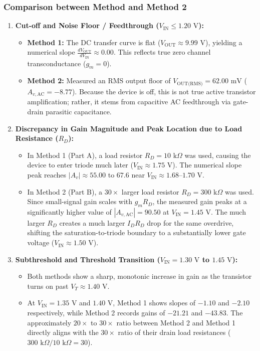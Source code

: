 \documentclass[11pt,a4paper]{article}
\begin{document}
\subsubsection*{Comparison between Method and Method 2}
\begin{enumerate}
    \item \textbf{Cut-off and Noise Floor / Feedthrough ($V_{\text{IN}} \le 1.20\text{ V}$):}
    \begin{itemize}
        \item \textbf{Method 1:} The DC transfer curve is flat ($V_{\text{OUT}} \approx 9.99\text{ V}$), yielding a numerical slope $\frac{dV_{\text{OUT}}}{dV_{\text{IN}}} \approx 0.00$. This reflects true zero channel transconductance ($g_m = 0$).
        \item \textbf{Method 2:} Measured an RMS output floor of $V_{\text{OUT(RMS)}} = 62.00\text{ mV}$ ($A_{v,\text{AC}} = -8.77$). Because the device is off, this is not true active transistor amplification; rather, it stems from capacitive AC feedthrough via gate-drain parasitic capacitance.
    \end{itemize}

    \item \textbf{Discrepancy in Gain Magnitude and Peak Location due to Load Resistance ($R_D$):}
    \begin{itemize}
        \item In Method 1 (Part A), a load resistor $R_D = 10\text{ k}\Omega$ was used, causing the device to enter triode much later ($V_{\text{IN}} \approx 1.75\text{ V}$). The numerical slope peak reaches $|A_v| \approx 55.00$ to $67.6$ near $V_{\text{IN}} \approx 1.68\text{--}1.70\text{ V}$.
        \item In Method 2 (Part B), a $30\times$ larger load resistor $R_D = 300\text{ k}\Omega$ was used. Since small-signal gain scales with $g_m R_D$, the measured gain peaks at a significantly higher value of \textbf{$|A_{v,\text{AC}}| = 90.50$} at \textbf{$V_{\text{IN}} = 1.45\text{ V}$}. The much larger $R_D$ creates a much larger $I_D R_D$ drop for the same overdrive, shifting the saturation-to-triode boundary to a substantially lower gate voltage ($V_{\text{IN}} \approx 1.50\text{ V}$).
    \end{itemize}

    \item \textbf{Subthreshold and Threshold Transition ($V_{\text{IN}} = 1.30\text{ V}$ to $1.45\text{ V}$):}
    \begin{itemize}
        \item Both methods show a sharp, monotonic increase in gain as the transistor turns on past $V_T \approx 1.40\text{ V}$.
        \item At $V_{\text{IN}} = 1.35\text{ V}$ and $1.40\text{ V}$, Method 1 shows slopes of $-1.10$ and $-2.10$ respectively, while Method 2 records gains of $-21.21$ and $-43.83$. The approximately $20\times$ to $30\times$ ratio between Method 2 and Method 1 directly aligns with the $30\times$ ratio of their drain load resistances ($300\text{ k}\Omega / 10\text{ k}\Omega = 30$).
    \end{itemize}


\end{enumerate}
\end{document}
